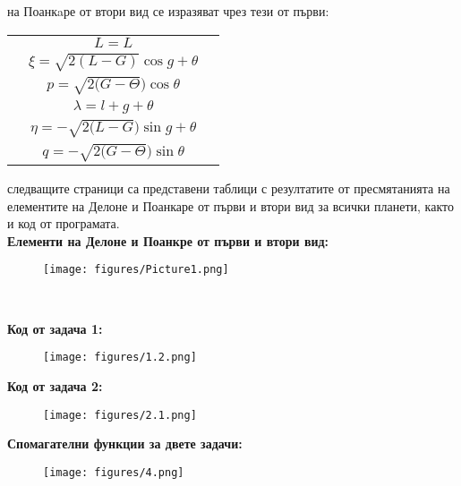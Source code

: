 \documentclass{article}
\begin{document}
 на Поанкaре от втори вид се изразяват чрез тези от първи:\\
\setlength{\tabcolsep}{6pt} %
\renewcommand{\arraystretch}{2} %
\begin{center}
\begin{tabular}{ c   c   c } 
    &$L=L$&\\
    &$\xi=\sqrt{2(L-G)}\cos{g+\theta}$&\\
    &$p=\sqrt{2(G-\Theta})\cos{\theta}$&\\
    &$\lambda = l+g+\theta$&\\
    &$\eta=-\sqrt{2(L-G})\sin{g+\theta}$&\\
    &$q=-\sqrt{2(G-\Theta})\sin{\theta}$&\\
\end{tabular}
\end{center}

\setlength{\parskip}{10em}
 следващите страници са представени таблици с резултатите от пресмятанията на елементите на Делоне и Поанкаре от първи и втори вид за всички планети, както и код от програмата.\\

\noindent\textbf{Елементи на Делоне и Поанкре от първи и втори вид:}
\begin{figure}[h]
\centering
\texttt{[image: figures/Picture1.png]}
\end{figure}\\
\newpage

\noindent\textbf{Код от задача 1:}\\
\begin{figure}[h]
\centering
\texttt{[image: figures/1.2.png]}
\end{figure}

\newpage

\noindent\textbf{Код от задача 2:}\\
\begin{figure}[h]
\centering
\texttt{[image: figures/2.1.png]}
\end{figure}
 
\newpage
\noindent\textbf{Спомагателни функции за двете задачи:}\\
\begin{figure}[h]
\centering
\texttt{[image: figures/4.png]}
\end{figure}

 
\end{document}
